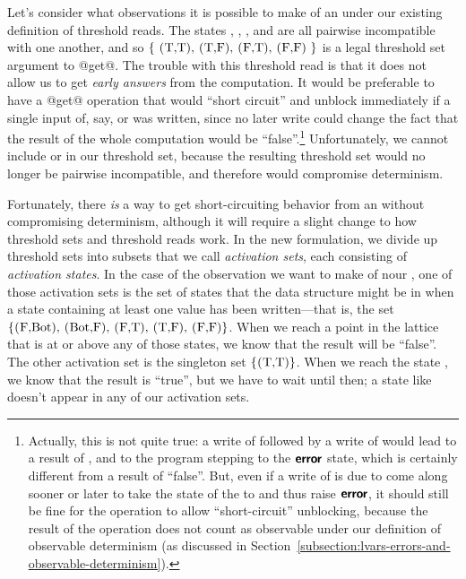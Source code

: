Let's consider what observations it is possible to make of an
 under our existing definition of threshold reads.  The
states , , , and  are all
pairwise incompatible with one another, and so $\setof{\textrm{
    \il{(T,T)}, \il{(T,F)}, \il{(F,T)}, \il{(F,F)} }}$ is a legal
threshold set argument to @get@.  The trouble with this threshold read
is that it does not allow us to get \emph{early answers} from the
computation.  It would be preferable to have a @get@ operation that
would ``short circuit'' and unblock immediately if a single input of,
say,  or  was written, since no later write
could change the fact that the result of the whole computation would
be ``false''.\footnote{Actually, this is not quite true: a write of
   followed by a write of  would lead to a
  result of , and to the program stepping to the $\textbf{\textsf{error}}$
  state, which is certainly different from a result of ``false''.
  But, even if a write of  is due to come along sooner or
  later to take the state of the  to  and thus raise
  $\textbf{\textsf{error}}$, it should still be fine for the  operation to
  allow ``short-circuit'' unblocking, because the result of the
   operation does not count as observable under our definition
  of observable determinism (as discussed in
  Section~\ref{subsection:lvars-errors-and-observable-determinism}).}
Unfortunately, we cannot include  or  in our
threshold set, because the resulting threshold set would no longer be
pairwise incompatible, and therefore would compromise determinism.

Fortunately, there \emph{is} a way to get short-circuiting behavior
from an  without compromising determinism, although it will
require a slight change to how threshold sets and threshold reads
work.  In the new formulation, we divide up threshold sets into
subsets that we call \emph{activation sets}, each consisting of
\emph{activation states}.  In the case of the observation we want to
make of nour , one of those activation sets is the set of
states that the data structure might be in when a state containing at
least one  value has been written---that is, the set $\setof{
  \textrm{\il{(F,Bot)}, \il{(Bot,F)}, \il{(F,T)}, \il{(T,F)},
    \il{(F,F)}} }$.  When we reach a point in the lattice that is at
or above any of those states, we know that the result will be
``false''.  The other activation set is the singleton set $\{
\textrm{\il{(T,T)}} \}$.  When we reach the state , we know
that the result is ``true'', but we have to wait until then; a state
like  doesn't appear in any of our activation sets.

